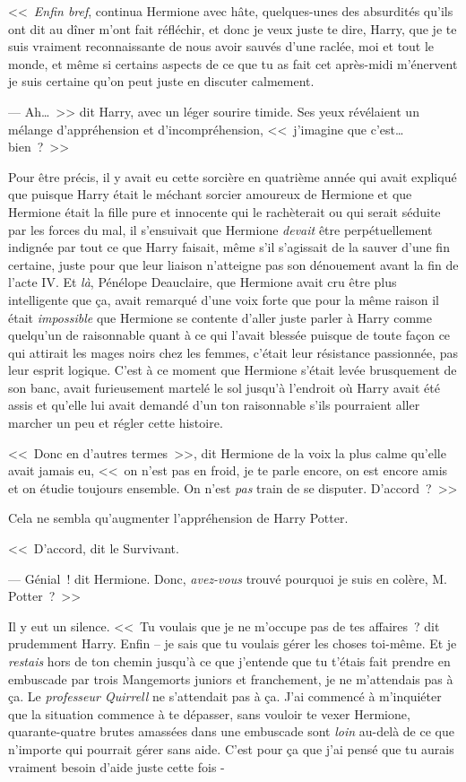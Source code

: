 <<~\emph{Enfin bref}, continua Hermione avec hâte, quelques-unes des absurdités qu'ils ont dit au dîner m'ont fait réfléchir, et donc je veux juste te dire, Harry, que je te suis vraiment reconnaissante de nous avoir sauvés d'une raclée, moi et tout le monde, et même si certains aspects de ce que tu as fait cet après-midi m'énervent je suis certaine qu'on peut juste en discuter calmement.

--- Ah…~>> dit Harry, avec un léger sourire timide. Ses yeux révélaient un mélange d'appréhension et d'incompréhension, <<~j'imagine que c'est… bien~?~>>

Pour être précis, il y avait eu cette sorcière en quatrième année qui avait expliqué que puisque Harry était le méchant sorcier amoureux de Hermione et que Hermione était la fille pure et innocente qui le rachèterait ou qui serait séduite par les forces du mal, il s'ensuivait que Hermione \emph{devait} être perpétuellement indignée par tout ce que Harry faisait, même s'il s'agissait de la sauver d'une fin certaine, juste pour que leur liaison n'atteigne pas son dénouement avant la fin de l'acte IV. Et \emph{là}, Pénélope Deauclaire, que Hermione avait cru être plus intelligente que ça, avait remarqué d'une voix forte que pour la même raison il était \emph{impossible} que Hermione se contente d'aller juste parler à Harry comme quelqu'un de raisonnable quant à ce qui l'avait blessée puisque de toute façon ce qui attirait les mages noirs chez les femmes, c'était leur résistance passionnée, pas leur esprit logique. C'est à ce moment que Hermione s'était levée brusquement de son banc, avait furieusement martelé le sol jusqu'à l'endroit où Harry avait été assis et qu'elle lui avait demandé d'un ton raisonnable s'ils pourraient aller marcher un peu et régler cette histoire.

<<~Donc en d'autres termes~>>, dit Hermione de la voix la plus calme qu'elle avait jamais eu, <<~on n'est pas en froid, je te parle encore, on est encore amis et on étudie toujours ensemble. On n'est \emph{pas} train de se disputer. D'accord~?~>>

Cela ne sembla qu'augmenter l'appréhension de Harry Potter.

<<~D'accord, dit le Survivant.

--- Génial~! dit Hermione. Donc, \emph{avez-vous} trouvé pourquoi je suis en colère, M. Potter~?~>>

Il y eut un silence. <<~Tu voulais que je ne m'occupe pas de tes affaires~? dit prudemment Harry. Enfin -- je sais que tu voulais gérer les choses toi-même. Et je \emph{restais} hors de ton chemin jusqu'à ce que j'entende que tu t'étais fait prendre en embuscade par trois Mangemorts juniors et franchement, je ne m'attendais pas à ça. Le \emph{professeur Quirrell} ne s'attendait pas à ça. J'ai commencé à m'inquiéter que la situation commence à te dépasser, sans vouloir te vexer Hermione, quarante-quatre brutes amassées dans une embuscade sont \emph{loin} au-delà de ce que n'importe qui pourrait gérer sans aide. C'est pour ça que j'ai pensé que tu aurais vraiment besoin d'aide juste cette fois -


